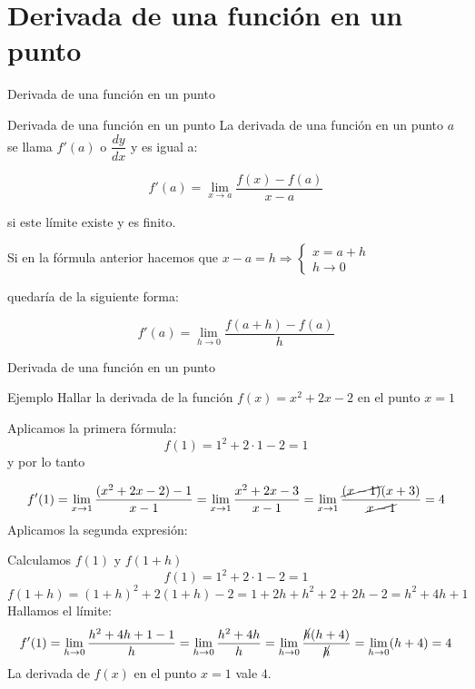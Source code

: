 \documentclass[8pt]{beamer}
\begin{document}
\section{Derivada de una función en un punto}
\begin{frame}{Derivada de una función en un punto}
\begin{alertblock}{Derivada de una función en un punto}
La derivada de una función en un punto $a$ se llama $f'(a)$ o $ \dfrac{dy}{dx}$ y es igual a:

\[ f'(a)=\lim_{x \rightarrow a} \dfrac{f(x)-f(a)}{x-a} \]

si este límite existe y es finito.

\pause
Si en la fórmula anterior hacemos que $x-a = h \Rightarrow \begin{cases} x=a+h \\ h \rightarrow 0 \end{cases}$

quedaría de la siguiente forma:

\[ f'(a)=\lim_{h \to 0} \dfrac{f(a+h)-f(a)}{h} \]
\end{alertblock}

\end{frame}

\begin{frame}{Derivada de una función en un punto}
\begin{exampleblock}{Ejemplo}
Hallar la derivada de la función $f(x)=x^2+2x-2$ en el punto $x=1$
\end{exampleblock}

\pause

Aplicamos la primera fórmula:
\[ f(1)= 1^2+2\cdot 1 -2 = 1 \]
\pause
y por lo tanto 

\pause
\[ f'(1)=\lim_{x \rightarrow 1} \dfrac{(x^2+ 2x-2) -1 }{x-1}= \lim_{x \rightarrow 1} \dfrac{x^2+ 2x-3 }{x-1} = \lim_{x \rightarrow 1} \dfrac{\cancel{(x-1)}(x+3) }{\cancel{x-1}}= 4 \] 
\pause
Aplicamos la segunda expresión:

\pause
Calculamos $f(1)$ y $f(1+h)$
\[ f(1)=1^2+2\cdot 1 -2 = 1 \]
\[ f(1+h)=(1+h)^2+2(1+h)-2= 1+2h+h^2+2+2h-2= h^2+4h+1 \]
\pause
Hallamos el límite:
\pause
\[ \displaystyle f'(1)=\lim_{h \to 0} {\dfrac{h^2+4h+1-1}{h}}= \lim_{h \to 0 } {\dfrac{h^2+4h}{h}}=\lim_{h \to 0} {\dfrac{\cancel{h}(h+4)}{\cancel{h}}}=\lim_{h \to 0} (h+4) = 4 \]
\pause
La derivada de $f(x)$ en el punto $x=1$ vale $4$.

\end{frame}
\end{document}

